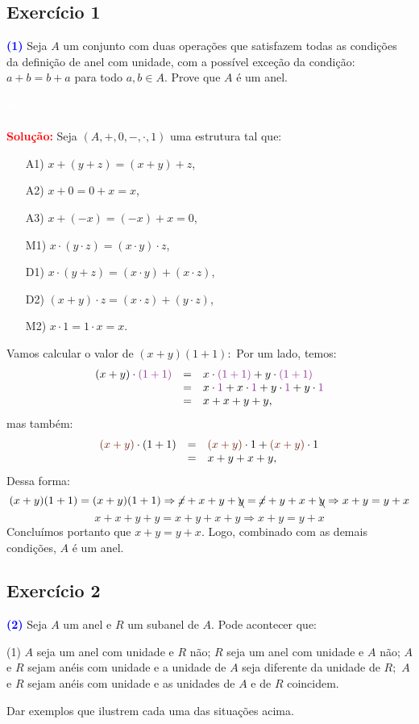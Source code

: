 \documentclass[11pt,a4paper]{article}
\newcommand{\exercicio}[1]{\subsection{Exercício #1} \textcolor{blue}{\bf(#1)}}
\newcommand{\dividiritens}[1]{\begin{tasks}[counter-format={(tsk[a])},label-width=3.6ex, label-format = {\bfseries}, column-sep = {0pt}](1) #1 \end{tasks}}
\newcommand{\pers}[1]{\textcolor{Floresta}{$\negrito{(#1)} $}}
\newcommand{\solucao}[1]{
\textbf{\textcolor{white}{oi}\\ \\ \textcolor{red}{Solução:}} #1}
\begin{document}
\exercicio{1} Seja $A$ um conjunto com duas operações que satisfazem todas as condições da definição de anel com
unidade, com a possível exceção da condição: $a + b = b + a$ para todo $a, b \in A.$ Prove que $A$ é um anel.
\solucao{
Seja $(A,+,0,-,\cdot,1)$ uma estrutura tal que:
\begin{itemize}
\item[A1)] $x+(y+z)=(x+y)+z$,
\item[A2)] $x+0=0+x=x$,
\item[A3)] $x+(-x)=(-x)+x=0$,
\item[M1)] $x\cdot(y\cdot z)=(x\cdot y)\cdot z$,
\item[D1)] $x\cdot(y+z)=(x\cdot y)+(x\cdot z)$,
\item[D2)] $(x+y)\cdot z=(x\cdot z)+(y\cdot z)$,
\item[M2)] $x\cdot 1=1\cdot x=x$.
\end{itemize}

Vamos calcular o valor de $(x+y)(1+1):$
Por um lado, temos:
\[
\begin{array}{rcl}
(x+y)\cdot \textcolor{Purple}{(1+1)}&=& x\cdot\textcolor{Purple}{(1+1)}+y\cdot \textcolor{Purple}{(1+1)}\\&=&x\cdot \textcolor{Purple}{1}+x\cdot \textcolor{Purple}{1}+y\cdot \textcolor{Purple}{1}+y\cdot \textcolor{Purple}{1}\\&=&x+x+y+y,
\end{array}
\]
mas também:
\[
\begin{array}{rcl}
\textcolor{Brown}{(x+y)}\cdot(1+1)&=& \textcolor{Brown}{(x+y)}\cdot 1+\textcolor{Brown}{(x+y)}\cdot 1\\&=&x+y+x+y,
\end{array}
\]
Dessa forma:
\[
(x+y)(1+1) = (x+y)(1+1) \Rightarrow \cancel{x} + x + y + \bcancel{y} = \cancel{x} + y + x + \bcancel{y} \Rightarrow x + y = y + x
\]
\[
x+x+y+y=x+y+x+y \Rightarrow \boxed{x+y=y+x}
\]
Concluímos portanto que $x+y=y+x.$ Logo, combinado com as demais condições, $A$ é um anel.


}
\exercicio{2}
Seja $A$ um anel e $R$ um subanel de $A.$ Pode acontecer que:
\dividiritens{
\task[\pers{a}] $A$ seja um anel com unidade e $R$ não;
\task[\pers{b}] $R$ seja um anel com unidade e $A$ não;
\task[\pers{c}] $A$ e $R$ sejam anéis com unidade e a unidade de $A$ seja diferente da unidade de $R;$
\task[\pers{d}] $A$ e $R$ sejam anéis com unidade e as unidades de $A$ e de $R$ coincidem.
}
Dar exemplos que ilustrem cada uma das situações acima.
\end{document}
